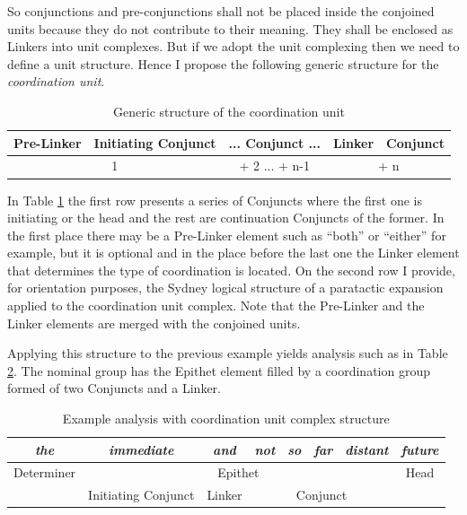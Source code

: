 So conjunctions and pre-conjunctions shall not be placed inside the conjoined units because they do not contribute to their meaning. They shall be enclosed as Linkers into unit complexes. But if we adopt the unit complexing then we need to define a unit structure. Hence I propose the following generic structure for the \textit{coordination unit}.

\begin{table}[!h]
    \centering
    \begin{tabular}{|c|c|c|c|c|}
        \hline
        Pre-Linker & Initiating Conjunct & ... Conjunct ... & Linker & Conjunct \\ \hline
        \multicolumn{2}{|c|}{1} & + 2 ... + n-1 & \multicolumn{2}{c|}{+ n} \\ \hline
    \end{tabular}
    \caption{Generic structure of the coordination unit}
    \label{tab:coordination-complex}
\end{table}

In Table \ref{tab:coordination-complex} the first row presents a series of Conjuncts where the first one is initiating or the head and the rest are continuation Conjuncts of the former. In the first place there may be a Pre-Linker element such as ``both'' or ``either'' for example, but it is optional and in the place before the last one the Linker element that determines the type of coordination is located. On the second row I provide, for orientation purposes, the Sydney logical structure of a paratactic expansion applied to the coordination unit complex. Note that the Pre-Linker and the Linker elements are merged with the conjoined units.

Applying this structure to the previous example yields analysis such as in Table \ref{tab:distant-future-compelx}. The nominal group has the Epithet element filled by a coordination group formed of two Conjuncts and a Linker.

\begin{table}[!ht]
    \centering
    \begin{tabular}{c|c|c|c|c|c|c|c}
        \hline
        \multicolumn{1}{|c|}{\textit{the}} & \textit{immediate} & \textit{and} & \textit{not} & \textit{so} & \textit{far} & \textit{distant} & \multicolumn{1}{c|}{\textit{future}} \\ \hline
        \multicolumn{1}{|c|}{Determiner} & \multicolumn{6}{c|}{Epithet} & \multicolumn{1}{c|}{Head} \\ \hline
        & Initiating Conjunct & Linker & \multicolumn{4}{c|}{Conjunct} &  \\ \cline{2-7}
    \end{tabular}
    \caption{Example analysis with coordination unit complex structure}
    \label{tab:distant-future-compelx}
\end{table}

